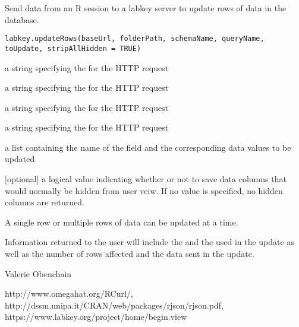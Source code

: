 \documentclass{article}
\begin{document}
\begin{Description}\relax
Send data from an R session to a labkey server to update rows of data in the database.
\end{Description}
\begin{Usage}
\begin{verbatim}
labkey.updateRows(baseUrl, folderPath, schemaName, queryName, toUpdate, stripAllHidden = TRUE)
\end{verbatim}
\end{Usage}
\begin{Arguments}
\begin{ldescription}
\item[\code{baseUrl}] a string specifying the for the HTTP request
\item[\code{folderPath}] a string specifying the  for the HTTP request
\item[\code{schemaName}] a string specifying the   for the HTTP request
\item[\code{queryName}] a string specifying the   for the HTTP request
\item[\code{toUpdate}] a list containing the name of the field and the corresponding data values to be updated
\item[\code{stripAllHidden}] [optional] a logical value indicating whether or not to save data columns that would 
normally be hidden from user veiw. If no value is specified, no hidden columns are returned.
\end{ldescription}
\end{Arguments}
\begin{Details}\relax
A single row or multiple rows of data can be updated at a time.
\end{Details}
\begin{Value}
Information returned to the user will include the  and the  used in the update
as well as the number of rows affected and the data sent in the update.
\end{Value}
\begin{Author}\relax
Valerie Obenchain
\end{Author}
\begin{References}\relax
http://www.omegahat.org/RCurl/, 
http://dssm.unipa.it/CRAN/web/packages/rjson/rjson.pdf,
https://www.labkey.org/project/home/begin.view
\end{References}
\begin{SeeAlso}\relax
{}
\end{SeeAlso}
\end{document}
